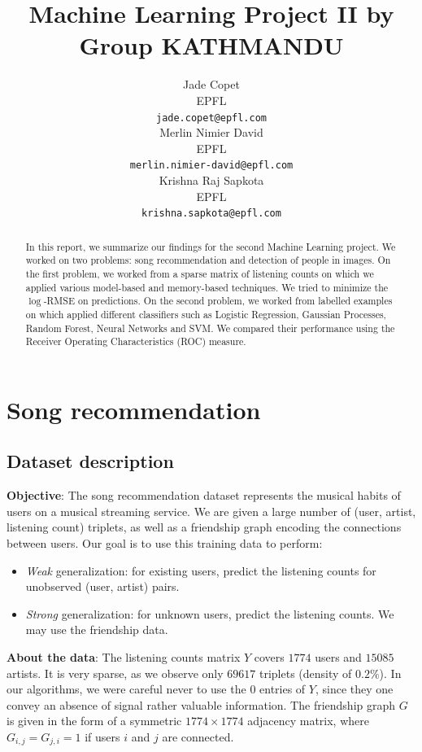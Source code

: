 \documentclass[10pt,a4paper]{article}
\title{Machine Learning Project II by Group KATHMANDU}
\author{
  Jade Copet\\
  EPFL \\
  \texttt{jade.copet@epfl.com} \\
  \And
  Merlin Nimier David\\
  EPFL \\
  \texttt{merlin.nimier-david@epfl.com} \\
  \And
  Krishna Raj Sapkota\\
  EPFL \\
  \texttt{krishna.sapkota@epfl.com} \\
}
\begin{document}
\maketitle


\begin{abstract}
  In this report, we summarize our findings for the second Machine Learning project. We worked on two problems: song recommendation and detection of people in images. On the first problem, we worked from a sparse matrix of listening counts on which we applied various model-based and memory-based techniques. We tried to minimize the $\log$-RMSE on predictions. On the second problem, we worked from labelled examples on which applied different classifiers such as Logistic Regression, Gaussian Processes, Random Forest, Neural Networks and SVM. We compared their performance using the Receiver Operating Characteristics (ROC) measure.
\end{abstract}

\section{Song recommendation}

  \subsection{Dataset description}
  \textbf{Objective}: The song recommendation dataset represents the musical habits of users on a musical streaming service. We are given a large number of (user, artist, listening count) triplets, as well as a friendship graph encoding the connections between users. Our goal is to use this training data to perform:

  \begin{itemize}
    \item \textit{Weak} generalization: for existing users, predict the listening counts for unobserved (user, artist) pairs.
    \item \textit{Strong} generalization: for unknown users, predict the listening counts. We may use the friendship data.
  \end{itemize}

  \textbf{About the data}: The listening counts matrix $Y$ covers $1774$ users and $15085$ artists. It is very sparse, as we observe only $69617$ triplets (density of $0.2\%$). In our algorithms, we were careful never to use the $0$ entries of $Y$, since they one convey an absence of signal rather valuable information. The friendship graph $G$ is given in the form of a symmetric $1774 \times 1774$ adjacency matrix, where $G_{i, j} = G_{j, i} = 1$ if users $i$ and $j$ are connected.\\
\end{document}
